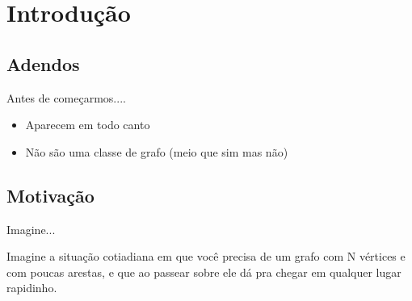 \section{Introdução}

\subsection{Adendos}

\begin{frame}{Antes de começarmos....}
    \begin{itemize}[<+-| alert@+>] 
      \item Aparecem em todo canto
        \item Não são uma classe de grafo (meio que sim mas
          não)
    \end{itemize}
\end{frame}


\subsection{Motivação}

\begin{frame}[c]{Imagine...}

  Imagine a situação cotiadiana em que você precisa de um grafo com N vértices e
  com poucas arestas, e que ao passear sobre ele dá pra chegar em qualquer lugar rapidinho.
  \vspace{40pt}
\end{frame}

